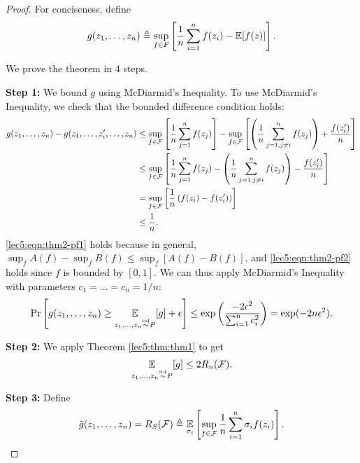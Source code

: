 \begin{proof}
For conciseness, define
\begin{equation} g(z_1, \dots, z_n) \triangleq \sup_{f\in F} \left[ \frac{1}{n} \sum^{n}_{i=1} f(z_i) - \operatorname*{\mathbb{E}}[f(z)]\right]. \end{equation}

We prove the theorem in 4 steps.

\textbf{Step 1:} We bound $g$ using McDiarmid's Inequality. To use McDiarmid's Inequality, we check that the bounded difference condition holds:
\begin{align}
    g(z_1, \dots, z_n) - g(z_1, \dots, z_i', \dots, z_n)
    &\leq \sup_{f\in \mathcal F} \left[ \frac{1}{n} \sum^{n}_{j=1} f(z_j) \right] - \sup_{f\in \mathcal F} \left[ \left(\frac{1}{n} \sum^{n}_{j=1, j \neq i} f(z_j)\right) + \frac{f(z_i')}{n} \right]  \\
    &\leq \sup_{f\in \mathcal F} \left[ \frac{1}{n} \sum^{n}_{j=1} f(z_j) - \left(\frac{1}{n} \sum^{n}_{j=1, j \neq i} f(z_j)\right) - \frac{f(z_i')}{n} \right] \label{lec5:eqn:thm2-pf1} \\
    &= \sup_{f\in \mathcal F}\left[ \frac{1}{n} \left( f(z_i) - f(z_i') \right) \right] \\
    &\leq \frac{1}{n}. \label{lec5:eqn:thm2-pf2}
\end{align}
\eqref{lec5:eqn:thm2-pf1} holds because in general, $\sup_f A(f) - \sup_f B(f) \leq \sup_f [A(f) - B(f)]$, and \eqref{lec5:eqn:thm2-pf2} holds since $f$ is bounded by $[0,1]$. We can thus apply McDiarmid's Inequality with parameters $c_1 = \dots = c_n = 1/n$:
\begin{align}
    \Pr\left[ g(z_1, \dots, z_n) \geq \operatorname*{\mathbb{E}}_{z_1,\dots, z_n \overset{\textup{iid}}{\sim} P}[g] + \epsilon \right] \leq \exp{\left( \frac{-2\epsilon^2}{\sum^n_{i=1} c_i^2 }\right)} = \exp(-2n\epsilon^2).
\end{align}

\textbf{Step 2:} We apply Theorem \ref{lec5:thm:thm1} to get 
\begin{align}
 \operatorname*{\mathbb{E}}_{z_1,\dots, z_n \overset{\textup{iid}}{\sim} P}[g] \leq 2R_n(\mathcal F).
\end{align}

\textbf{Step 3:} Define
\begin{equation} \tilde g (z_1, \dots, z_n) = R_S(\mathcal F) \triangleq \operatorname*{\mathbb{E}}_{\sigma_i}\left[\sup_{f\in \mathcal F} \frac{1}{n} \sum^n_{i=1} \sigma_i f(z_i)\right]. \end{equation}


\end{proof}

